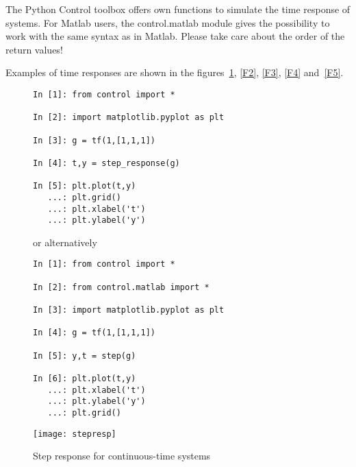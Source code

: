 The Python Control toolbox offers own functions to simulate the time 
response of systems. For Matlab users, the control.matlab module gives the 
possibility to work with the same syntax as in Matlab.
Please take care about the order of the return values!

Examples of time responses are shown in the figures~\ref{F1}, \ref{F2}, 
\ref{F3}, \ref{F4} and~\ref{F5}.

\begin{figure}[htbp]	%
\begin{minipage}[t]{0.55\textwidth}
  \vspace{0pt}
\begin{lstlisting}[linewidth=7cm, xleftmargin=0cm]
In [1]: from control import *

In [2]: import matplotlib.pyplot as plt

In [3]: g = tf(1,[1,1,1])

In [4]: t,y = step_response(g)

In [5]: plt.plot(t,y)
   ...: plt.grid()
   ...: plt.xlabel('t')
   ...: plt.ylabel('y')

\end{lstlisting}

or alternatively

\begin{lstlisting}[linewidth=7cm,xleftmargin=0cm]
In [1]: from control import *

In [2]: from control.matlab import *

In [3]: import matplotlib.pyplot as plt

In [4]: g = tf(1,[1,1,1])

In [5]: y,t = step(g)

In [6]: plt.plot(t,y)
   ...: plt.xlabel('t')
   ...: plt.ylabel('y')
   ...: plt.grid()
\end{lstlisting}
\end{minipage}%
\begin{minipage}[t]{0.45\textwidth}
  \centering
  \vspace{0.2cm}
  \texttt{[image: stepresp]}
\end{minipage}
\caption{Step response for continuous-time systems}
\label{F1}
\end{figure}

